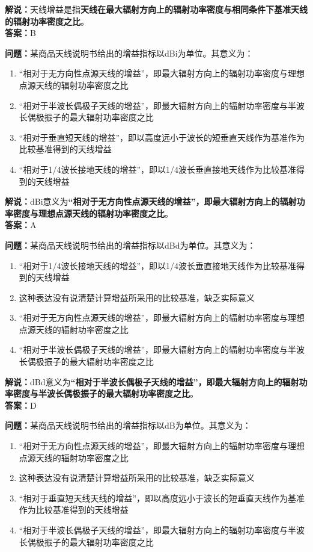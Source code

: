 \textbf{解说：}天线增益是指\textbf{天线在最大辐射方向上的辐射功率密度与相同条件下基准天线的辐射功率密度之比}。\\\textbf{答案：}B



\textbf{问题：}某商品天线说明书给出的增益指标以dBi为单位。其意义为：
\begin{enumerate}[label=\Alph*), leftmargin=1.5cm]
	\item “相对于无方向性点源天线的增益”，即最大辐射方向上的辐射功率密度与理想点源天线的辐射功率密度之比
	\item “相对于半波长偶极子天线的增益”，即最大辐射方向上的辐射功率密度与半波长偶极振子的最大辐射功率密度之比
	\item “相对于垂直短天线的增益”，即以高度远小于波长的短垂直天线作为基准作为比较基准得到的天线增益
	\item “相对于1/4波长接地天线的增益”，即以1/4波长垂直接地天线作为比较基准得到的天线增益
\end{enumerate}

\textbf{解说：}dBi意义为\textbf{“相对于无方向性点源天线的增益”，即最大辐射方向上的辐射功率密度与理想点源天线的辐射功率密度之比}。\\\textbf{答案：}A



\textbf{问题：}某商品天线说明书给出的增益指标以dBd为单位。其意义为：

\begin{enumerate}[label=\Alph*), leftmargin=1.5cm]
	\item “相对于1/4波长接地天线的增益”，即以1/4波长垂直接地天线作为比较基准得到的天线增益
	\item 这种表达没有说清楚计算增益所采用的比较基准，缺乏实际意义
	\item “相对于无方向性点源天线的增益”，即最大辐射方向上的辐射功率密度与理想点源天线的辐射功率密度之比
	\item “相对于半波长偶极子天线的增益”，即最大辐射方向上的辐射功率密度与半波长偶极振子的最大辐射功率密度之比
\end{enumerate}

\textbf{解说：}dBd意义为\textbf{“相对于半波长偶极子天线的增益”，即最大辐射方向上的辐射功率密度与半波长偶极振子的最大辐射功率密度之比}。\\\textbf{答案：}D



\textbf{问题：}某商品天线说明书给出的增益指标以dB为单位。其意义为：

\begin{enumerate}[label=\Alph*), leftmargin=1.5cm]
	\item “相对于无方向性点源天线的增益”，即最大辐射方向上的辐射功率密度与理想点源天线的辐射功率密度之比
	\item 这种表达没有说清楚计算增益所采用的比较基准，缺乏实际意义
	\item “相对于垂直短天线天线的增益”，即以高度远小于波长的短垂直天线作为基准作为比较基准得到的天线增益
	\item “相对于半波长偶极子天线的增益”，即最大辐射方向上的辐射功率密度与半波长偶极振子的最大辐射功率密度之比
\end{enumerate}

